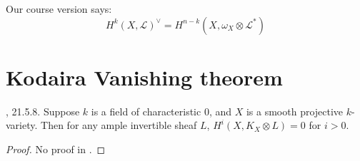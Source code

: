Our course version says:
$$
H^{k}(X,\mathcal{L})^{\vee}=H^{n-k}(X,\omega_X \otimes \mathcal{L}^*)
$$
\section{Kodaira Vanishing theorem}
\label{section-Kodaira-vanishing-theorem}

\begin{theorem}[Kodaira]
\label{theorem-Kodaira-vanishing}
\cite{sea}, 21.5.8. Suppose $k$ is a field of characteristic 0, and $X$ is a
smooth projective $k$-variety. Then for any ample invertible sheaf $L$,
$H^{i}(X,K_X \otimes L)=0$ for $i>0$.
\end{theorem}

\begin{proof}
No proof in \cite{sea}.
\end{proof}






